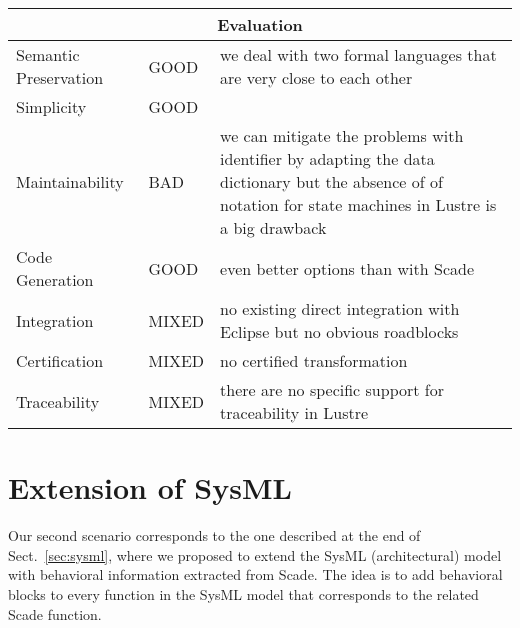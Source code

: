 \documentclass{template/openetcs_report}
\begin{document}
\begin{tabular}[c]{|p{3.5cm}|p{1.2cm}|p{8.8cm}|}

  \hline
  \multicolumn{3}{|c|}{Evaluation} \\
  \hline

  Semantic Preservation & GOOD & we deal with two formal languages that are very close to
                                 each other \\

  \hline

  Simplicity &  GOOD & \\

  \hline

  Maintainability & BAD & we can mitigate the problems with identifier
                          by adapting the data dictionary but the absence of
                          of notation for state machines in Lustre is a big drawback \\

  \hline

  Code Generation & GOOD &  even better options than with Scade\\

  \hline

  Integration & MIXED & no existing direct integration with Eclipse but no
                        obvious roadblocks \\

  \hline

  Certification & MIXED & no certified transformation\\
  
  \hline
  
  Traceability & MIXED & there are no specific support for
                         traceability in Lustre\\
  
  \hline

\end{tabular}


\section{Extension of SysML}
\label{sec:sysml-variant}

Our second scenario corresponds to the one described at the end of
Sect.~\ref{sec:sysml}, where we proposed to extend the SysML
(architectural) model with behavioral information extracted from Scade.
The idea is to add behavioral blocks to every function in the SysML
model that corresponds to the related Scade function.
\end{document}
